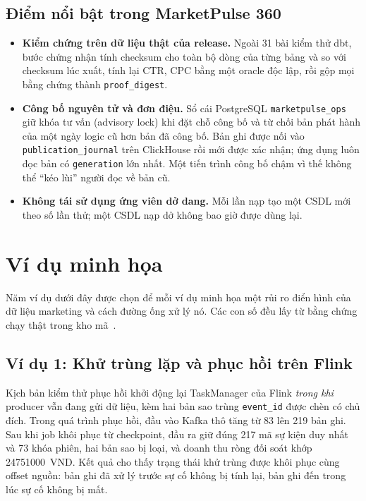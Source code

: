 \subsection{Điểm nổi bật trong MarketPulse 360}
\label{sec:c3-dagster-hien-thuc}
\begin{itemize}
    \item \textbf{Kiểm chứng trên dữ liệu thật của release.} Ngoài 31 bài kiểm thử dbt, bước chứng nhận tính checksum cho toàn bộ dòng của từng bảng và so với checksum lúc xuất, tính lại CTR, CPC bằng một oracle độc lập, rồi gộp mọi bằng chứng thành \texttt{proof\_digest}.
    \item \textbf{Công bố nguyên tử và đơn điệu.} Sổ cái PostgreSQL \texttt{marketpulse\_ops} giữ khóa tư vấn (advisory lock) khi đặt chỗ công bố và từ chối bản phát hành của một ngày logic cũ hơn bản đã công bố. Bản ghi được nối vào \texttt{publication\_journal} trên ClickHouse rồi mới được xác nhận; ứng dụng luôn đọc bản có \texttt{generation} lớn nhất. Một tiến trình công bố chậm vì thế không thể ``kéo lùi'' người đọc về bản cũ.
    \item \textbf{Không tái sử dụng ứng viên dở dang.} Mỗi lần nạp tạo một CSDL mới theo số lần thử; một CSDL nạp dở không bao giờ được dùng lại.
\end{itemize}

\section{Ví dụ minh họa}
\label{sec:c3-vi-du}

Năm ví dụ dưới đây được chọn để mỗi ví dụ minh họa một rủi ro điển hình của dữ liệu marketing và cách đường ống xử lý nó. Các con số đều lấy từ bằng chứng chạy thật trong kho mã~\cite{mp360repo}.

\subsection{Ví dụ 1: Khử trùng lặp và phục hồi trên Flink}
\label{sec:c3-vi-du-1}
Kịch bản kiểm thử phục hồi khởi động lại TaskManager của Flink \emph{trong khi} producer vẫn đang gửi dữ liệu, kèm hai bản sao trùng \texttt{event\_id} được chèn có chủ đích. Trong quá trình phục hồi, đầu vào Kafka thô tăng từ 83 lên 219 bản ghi. Sau khi job khôi phục từ checkpoint, đầu ra giữ đúng 217 mã sự kiện duy nhất và 73 khóa phiên, hai bản sao bị loại, và doanh thu ròng đối soát khớp \num{24751000}~VND. Kết quả cho thấy trạng thái khử trùng được khôi phục cùng offset nguồn: bản ghi đã xử lý trước sự cố không bị tính lại, bản ghi đến trong lúc sự cố không bị mất.

